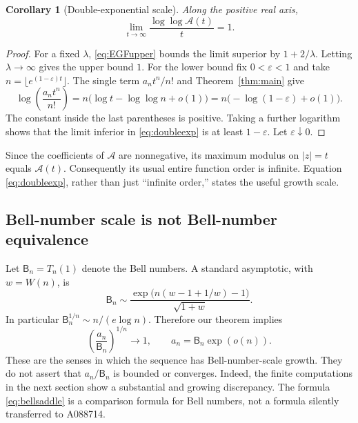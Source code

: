 \documentclass[11pt]{article}
\numberwithin{equation}{section}
\newtheorem{corollary}[theorem]{Corollary}
\theoremstyle{definition}
\theoremstyle{remark}
\newcommand{\eps}{\varepsilon}
\begin{document}
\begin{corollary}[Double-exponential scale]\label{cor:EGF}
Along the positive real axis,
\begin{equation}\label{eq:doubleexp}
 \lim_{t\to\infty}\frac{\log\log\mathcal A(t)}t=1.
\end{equation}
\end{corollary}
\begin{proof}
For a fixed $\lambda$, \eqref{eq:EGFupper} bounds the limit superior by
$1+2/\lambda$. Letting $\lambda\to\infty$ gives the upper bound $1$.
For the lower bound fix $0<\eps<1$ and take
$n=\lfloor e^{(1-\eps)t}\rfloor$. The single term $a_nt^n/n!$ and
Theorem~\ref{thm:main} give
\[
 \log\left(\frac{a_nt^n}{n!}\right)
 =n\bigl(\log t-\log\log n+o(1)\bigr)
 =n\bigl(-\log(1-\eps)+o(1)\bigr).
\]
The constant inside the last parentheses is positive. Taking a further
logarithm shows that the limit inferior in \eqref{eq:doubleexp} is at
least $1-\eps$. Let $\eps\downarrow0$.
\end{proof}
Since the coefficients of $\mathcal A$ are nonnegative, its maximum
modulus on $|z|=t$ equals $\mathcal A(t)$. Consequently its usual entire
function order is infinite. Equation \eqref{eq:doubleexp}, rather than
just ``infinite order,'' states the useful growth scale.

\subsection{Bell-number scale is not Bell-number equivalence}

Let $\mathsf B_n=T_n(1)$ denote the Bell numbers. A standard asymptotic,
with $w=W(n)$, is \cite{dlmf-bell}
\begin{equation}\label{eq:bellsaddle}
 \mathsf B_n\sim
 \frac{\exp\!\bigl(n(w-1+1/w)-1\bigr)}{\sqrt{1+w}}.
\end{equation}
In particular $\mathsf B_n^{1/n}\sim n/(e\log n)$. Therefore our theorem
implies
\begin{equation}\label{eq:bellroot}
 \left(\frac{a_n}{\mathsf B_n}\right)^{1/n}\longrightarrow1,
 \qquad
 a_n=\mathsf B_n\exp(o(n)).
\end{equation}
These are the senses in which the sequence has Bell-number-scale growth.
They do not assert that $a_n/\mathsf B_n$ is bounded or converges. Indeed,
the finite computations in the next section show a substantial and
growing discrepancy. The formula \eqref{eq:bellsaddle} is a comparison
formula for Bell numbers, not a formula silently transferred to A088714.
\end{document}
